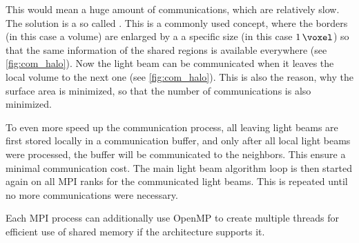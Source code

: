 %
This would mean a huge amount of communications, which are relatively slow.
The solution is a so called .
This is a commonly used concept, where the borders (in this case a volume) are enlarged by a a specific size (in this case $\SI{1}{\voxel}$) so that the same information of the shared regions is available everywhere (see \cref{fig:com_halo}).
%
Now the light beam can be communicated when it leaves the local volume to the next one (see \cref{fig:com_halo}).
This is also the reason, why the surface area is minimized, so that the number of communications is also minimized.
\par
To even more speed up the communication process, all leaving light beams are first stored locally in a communication buffer, and only after all local light beams were processed, the buffer will be communicated to the neighbors.
This ensure a minimal communication cost.
The main light beam algorithm loop is then started again on all \ac{MPI} ranks for the communicated light beams.
This is repeated until no more communications were necessary.
\par
%
Each \ac{MPI} process can additionally use \ac{OpenMP} to create multiple threads for efficient use of shared memory if the architecture supports it.
% 
%